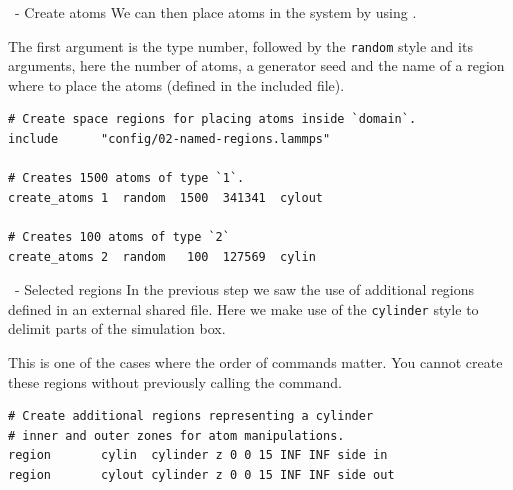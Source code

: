 \begin{frame}[fragile]{\secname}{\subsecname\ - Create atoms}
We can then place atoms in the system by using .

\vspace{0.5cm}

The first argument is the type number, followed by the \Verb|random| style and its arguments, here the number of atoms, a generator seed and the name of a region where to place the atoms (defined in the included file).
\vspace{0.5cm}

\begin{lstlisting}[language=LAMMPS,basicstyle=\small]
# Create space regions for placing atoms inside `domain`.
include      "config/02-named-regions.lammps"

# Creates 1500 atoms of type `1`.
create_atoms 1  random  1500  341341  cylout

# Creates 100 atoms of type `2`
create_atoms 2  random   100  127569  cylin
\end{lstlisting}
\end{frame}

\begin{frame}[fragile]{\secname}{\subsecname\ - Selected regions}
In the previous step we saw the use of additional regions defined in an external shared file. Here we make use of the \Verb|cylinder| style to delimit parts of the simulation box.

\vspace{0.5cm}

This is one of the cases where the order of commands matter. You cannot create these regions without previously calling the  command.

\vspace{0.5cm}

\begin{lstlisting}[language=LAMMPS,basicstyle=\small]
# Create additional regions representing a cylinder
# inner and outer zones for atom manipulations.
region       cylin  cylinder z 0 0 15 INF INF side in
region       cylout cylinder z 0 0 15 INF INF side out
\end{lstlisting}
\end{frame}

